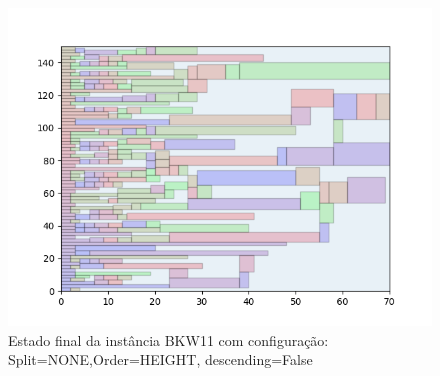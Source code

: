 \begin{figure}[H]
    \centering
    \caption[]{Estado final da instância BKW11 com configuração: Split=NONE,Order=HEIGHT, descending=False}
    \label{fig:bkw11-none-height-false}
    \includegraphics[scale=0.5]{output/figures/bkw/bkw11/none/height/false/000}
\end{figure}